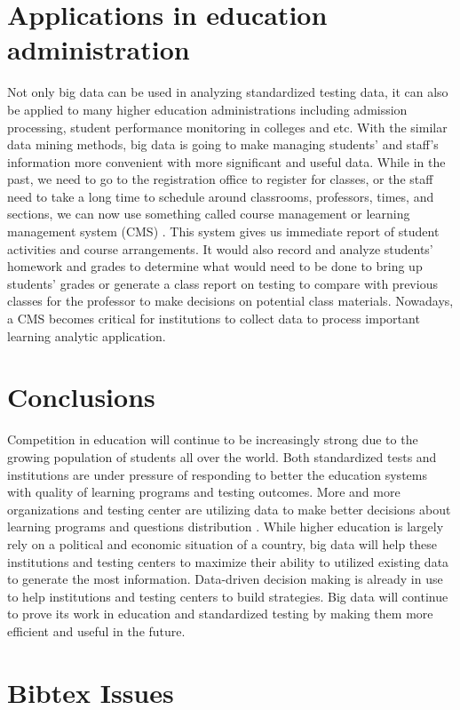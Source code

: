 \documentclass[sigconf]{acmart}
\begin{document}
\section{Applications in education administration}
Not only big data can be used in analyzing standardized testing data, it can also be applied to many higher education administrations including admission processing, student performance monitoring in colleges and etc\cite {Picciano2012}. With the similar data mining methods, big data is going to make managing students' and staff's information more convenient with more significant and useful data. While in the past, we need to go to the registration office to register for classes, or the staff need to take a long time to schedule around classrooms, professors, times, and sections, we can now use something called course management or learning management system (CMS) \cite {Picciano2012}. This system gives us immediate report of student activities and course arrangements. It would also record and analyze students' homework and grades to determine what would need to be done to bring up students' grades or 
generate a class report on testing to compare with previous classes for the professor to make decisions on potential class materials. Nowadays, a CMS becomes critical for institutions to collect data to process important learning analytic application.

\section{Conclusions}
Competition in education will continue to be increasingly strong due to the growing population of students all over the world\cite {Selingo2017}. Both standardized tests and institutions are under pressure of responding to better the education systems with quality of learning programs and testing outcomes. More and more organizations and testing center are utilizing data to make better decisions about learning programs and questions distribution \cite {Selingo2017}. While higher education is largely rely on a political and economic situation of a country, big data will help these institutions and testing centers to maximize their ability to utilized existing data to generate the most information. Data-driven decision making is already in use to help institutions and testing centers to build strategies. Big data will continue to prove its work in education and standardized testing by making them more efficient and useful in the future. 





 

\section{Bibtex Issues}

\end{document}
